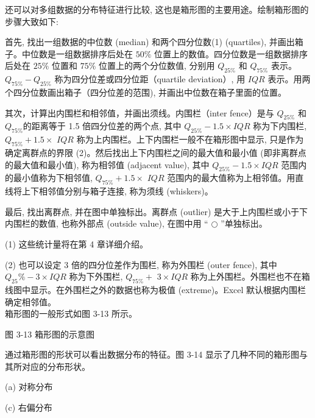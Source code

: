\documentclass[10pt]{article}
\begin{document}
\begin{CJK*}{UTF8}{bsmi}
还可以对多组数据的分布特征进行比较, 这也是箱形图的主要用途。绘制箱形图的步骤大致如下:

首先, 找出一组数据的中位数 (median) 和两个四分位数(1) (quartiles), 并画出箱子。中位数是一组数据排序后处在 $50 \%$ 位置上的数值。四分位数是一组数据排序后处在 $25 \%$ 位置和 $75 \%$ 位置上的两个分位数值, 分别用 $Q_{25 \%}$ 和 $Q_{75 \%}$ 表示。 $Q_{75 \%}-Q_{25 \%}$ 称为四分位差或四分位距（quartile deviation）, 用 $I Q R$ 表示。用两个四分位数画出箱子（四分位差的范围), 并画出中位数在箱子里面的位置。

其次，计算出内围栏和相邻值，并画出须线。内围栏（inter fence）是与 $Q_{25 \%}$ 和 $Q_{75 \%}$的距离等于 1.5 倍四分位差的两个点, 其中 $Q_{25 \%}-1.5 \times I Q R$ 称为下内围栏, $Q_{75 \%}+1.5 \times$ $I Q R$ 称为上内围栏。上下内围栏一般不在箱形图中显示, 只是作为确定离群点的界限 (2)。然后找出上下内围栏之间的最大值和最小值 (即非离群点的最大值和最小值), 称为相邻值 (adjacent value), 其中 $Q_{25 \%}-1.5 \times I Q R$ 范围内的最小值称为下相邻值, $Q_{75 \%}+1.5 \times$ $I Q R$ 范围内的最大值称为上相邻值。用直线将上下相邻值分别与箱子连接, 称为须线 (whiskers)。

最后, 找出离群点, 并在图中单独标出。离群点 (outlier) 是大于上内围栏或小于下内围栏的数值, 也称外部点 (outside value), 在图中用 “ $\bigcirc$ ”单独标出。

(1) 这些统计量将在第 4 章详细介绍。

(2) 也可以设定 3 倍的四分位差作为围栏, 称为外围栏 (outer fence), 其中 $Q_{25} \%-3 \times I Q R$ 称为下外围栏, $Q_{75 \%}+$ $3 \times I Q R$ 称为上外围栏。外围栏也不在箱线图中显示。在外围栏之外的数据也称为极值 (extreme)。Excel 默认根据内围栏确定相邻值。\\
箱形图的一般形式如图 3-13 所示。

\begin{center}
\end{center}

图 3-13 箱形图的示意图

通过箱形图的形状可以看出数据分布的特征。图 3-14 显示了几种不同的箱形图与其所对应的分布形状。

\begin{center}
\end{center}

(a) 对称分布

\begin{center}
\end{center}

(c) 右偏分布

\begin{center}
\end{center}


\end{CJK*}
\end{document}
